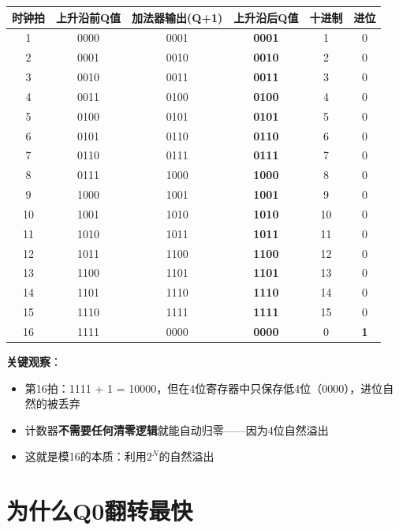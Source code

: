 \begin{beatanalysis}[4位计数器完整16拍]
\begin{center}
\begin{tabular}{|c|c|c|c|c|c|}
\hline
\textbf{时钟拍} & \textbf{上升沿前Q值} & \textbf{加法器输出}(Q+1) & \textbf{上升沿后Q值} & \textbf{十进制} & \textbf{进位} \\
\hline
1 & 0000 & 0001 & \textbf{0001} & 1 & 0 \\
2 & 0001 & 0010 & \textbf{0010} & 2 & 0 \\
3 & 0010 & 0011 & \textbf{0011} & 3 & 0 \\
4 & 0011 & 0100 & \textbf{0100} & 4 & 0 \\
5 & 0100 & 0101 & \textbf{0101} & 5 & 0 \\
6 & 0101 & 0110 & \textbf{0110} & 6 & 0 \\
7 & 0110 & 0111 & \textbf{0111} & 7 & 0 \\
8 & 0111 & 1000 & \textbf{1000} & 8 & 0 \\
9 & 1000 & 1001 & \textbf{1001} & 9 & 0 \\
10 & 1001 & 1010 & \textbf{1010} & 10 & 0 \\
11 & 1010 & 1011 & \textbf{1011} & 11 & 0 \\
12 & 1011 & 1100 & \textbf{1100} & 12 & 0 \\
13 & 1100 & 1101 & \textbf{1101} & 13 & 0 \\
14 & 1101 & 1110 & \textbf{1110} & 14 & 0 \\
15 & 1110 & 1111 & \textbf{1111} & 15 & 0 \\
16 & 1111 & 0000 & \textbf{0000} & 0 & \textbf{1} \\
\hline
\end{tabular}
\end{center}
\end{beatanalysis}

\textbf{关键观察}：
\begin{itemize}
  \item 第16拍：1111 + 1 = 10000，但在4位寄存器中只保存低4位（0000），进位自然的被丢弃
  \item 计数器\textbf{不需要任何清零逻辑}就能自动归零——因为4位自然溢出
  \item 这就是模16的本质：利用$2^N$的自然溢出
\end{itemize}

\section{为什么Q0翻转最快}


